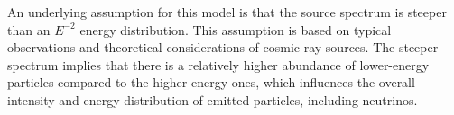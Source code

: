 An underlying assumption for this model is that the source spectrum is steeper than an \(E^{-2}\) energy distribution. This assumption is based on typical observations and theoretical considerations of cosmic ray sources. The steeper spectrum implies that there is a relatively higher abundance of lower-energy particles compared to the higher-energy ones, which influences the overall intensity and energy distribution of emitted particles, including neutrinos.

